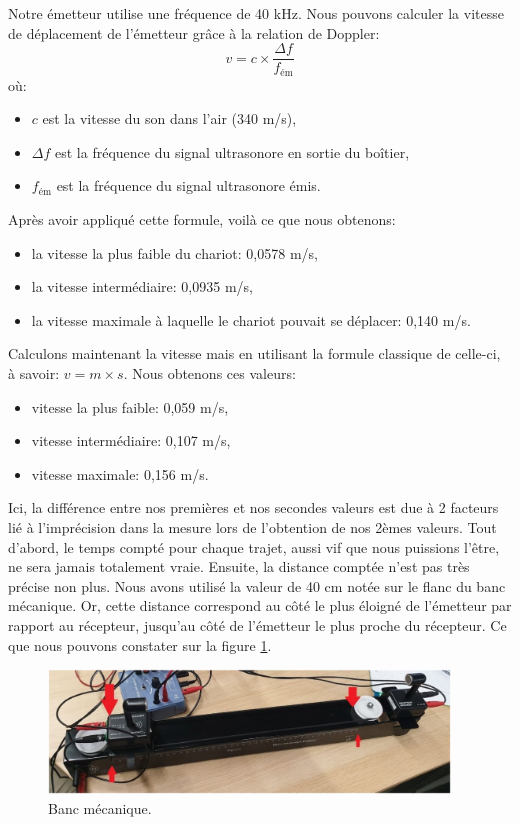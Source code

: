 \documentclass[a4paper]{article}
\begin{document}
Notre émetteur utilise une fréquence de 40 kHz. Nous pouvons calculer la vitesse de déplacement de l’émetteur grâce à la relation de Doppler:
\[ v = c \times \frac{\Delta f}{f_{\text{ém}}} \]
où:
\begin{itemize}
  \item $c$ est la vitesse du son dans l’air (340 m/s),
  \item $\Delta f$ est la fréquence du signal ultrasonore en sortie du boîtier,
  \item $ f_{\text{ém}} $ est la fréquence du signal ultrasonore émis.
\end{itemize}
Après avoir appliqué cette formule, voilà ce que nous obtenons:
\begin{itemize}
  \item la vitesse la plus faible du chariot: 0,0578 m/s,
  \item la vitesse intermédiaire: 0,0935 m/s,
  \item la vitesse maximale à laquelle le chariot pouvait se déplacer: 0,140 m/s.
\end{itemize}
Calculons maintenant la vitesse mais en utilisant la formule classique de celle-ci, à savoir: $ v = m \times s $. Nous obtenons ces valeurs:
\begin{itemize}
  \item vitesse la plus faible: 0,059 m/s,
  \item vitesse intermédiaire: 0,107 m/s,
  \item vitesse maximale: 0,156 m/s.
\end{itemize}
Ici, la différence entre nos premières et nos secondes valeurs est due à 2 facteurs lié à l'imprécision dans la mesure lors de l’obtention de nos 2èmes valeurs. Tout d’abord, le temps compté pour chaque trajet, aussi vif que nous puissions l’être, ne sera jamais totalement vraie. Ensuite, la distance comptée n’est pas très précise non plus. Nous avons utilisé la valeur de 40 cm notée sur le flanc du banc mécanique. Or, cette distance correspond au côté le plus éloigné de l’émetteur par rapport au récepteur, jusqu’au côté de l’émetteur le plus proche du récepteur. Ce que nous pouvons constater sur la figure \ref{fig:quarantecm}.

\begin{center}
  \begin{figure}[H]
    \centering
    \includegraphics[width=0.95\textwidth]{40cm.PNG}
    \caption{Banc mécanique.}
    \label{fig:quarantecm}
  \end{figure}
\end{center}
\end{document}
